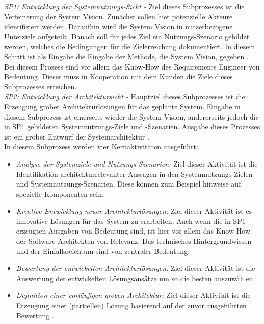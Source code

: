 \emph{SP1: Entwicklung der Systemnutzungs-Sicht -}
Ziel dieses Subprozesses ist die Verfeinerung der System Vision. Zun\"achst sollen hier potenzielle Akteure identifiziert werden. Daraufhin wird die System Vision in nutzerbezogene Unterziele aufgeteilt. Danach soll f\"ur jedes Ziel ein Nutzungs-Szenario gebildet werden, welches die Bedingungen f\"ur die Zielerreichung dokumentiert. In diesem Schritt ist als Eingabe die Eingabe der Methode, die System Vision, gegeben \cite{Poh01}. Bei diesem Prozess sind vor allem das Know-How des Requirements Engineer von Bedeutung. Dieser muss in Kooperation mit dem Kunden die Ziele dieses Subprozesses erreichen.\\

\emph{SP2: Entwicklung der Architektursicht -}
Hauptziel dieses Subprozesses ist die Erzeugung grober Architekturl\"osungen f\"ur das geplante System. Eingabe in diesem Subprozess ist einerseits wieder die System Vision, andererseits jedoch die in SP1 gebildeten Systemnutzungs-Ziele und -Szenarien. Ausgabe dieses Prozesses ist ein grober Entwurf der Systemarchitektur \cite{Poh01}.\\

In diesem Subprozess werden vier Kernaktivit\"aten ausgef\"uhrt:\\

\begin{itemize}
\item \emph{Analyse der Systemziele und Nutzungs-Szenarien:} Ziel dieser Aktivit\"at ist die Identifikation architekturrelevanter Aussagen in den Systemnutzungs-Zielen und Systemnutzungs-Szenarien. Diese k\"onnen zum Beispiel hinweise auf spezielle Komponenten sein. 
\item \emph{Kreative Entwicklung neuer Architekturl\"osungen:} Ziel dieser Aktivit\"at ist es innovative L\"osungen f\"ur das System zu erarbeiten. Auch wenn die in SP1 erzeugten Ausgaben von Bedeutung sind, ist hier vor allem das Know-How der Software-Architekten von Relevanz. Das technisches Hintergrundwissen und der Einfallsreichtum sind von zentraler Bedeutung.
\item \emph{Bewertung der entwickelten Architekturl\"osungen:} Ziel dieser Aktivit\"at ist die Auswertung der entwickelten L\"osungsans\"atze um so die besten auszuw\"ahlen. 
\item \emph{Definition einer vorl\"aufigen groben Architektur:} Ziel dieser Aktivit\"at ist die Erzeugung einer (partiellen) L\"osung basierend auf der zuvor ausgef\"uhrten Bewertung \cite{Poh01}.\\
\end{itemize} 

